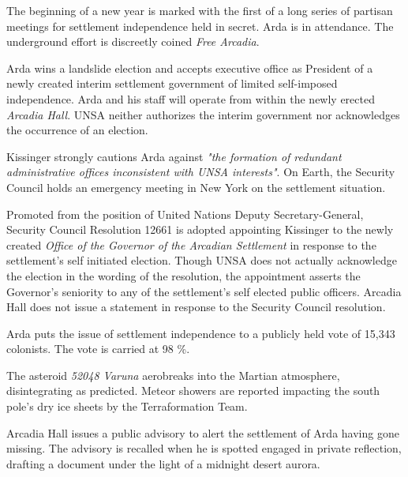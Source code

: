 

The beginning of a new year is marked with the first of a long series of partisan meetings for settlement independence held in secret. Arda is in attendance. The underground effort is discreetly coined {\it Free Arcadia}.
\StopTimelineDate

Arda wins a landslide election and accepts executive office as President of a newly created interim settlement government of limited self-imposed independence. Arda and his staff will operate from within the newly erected {\it Arcadia Hall}. UNSA neither authorizes the interim government nor acknowledges the occurrence of an election.

Kissinger strongly cautions Arda against {\it "the formation of redundant administrative offices inconsistent with UNSA interests"}. On Earth, the Security Council holds an emergency meeting in New York on the settlement situation.
\StopTimelineDate

Promoted from the position of United Nations Deputy Secretary-General, Security Council Resolution 12661 is adopted appointing Kissinger to the newly created {\it Office of the Governor of the Arcadian Settlement} in response to the settlement's self initiated election. Though UNSA does not actually acknowledge the election in the wording of the resolution, the appointment asserts the Governor's seniority to any of the settlement's self elected public officers. Arcadia Hall does not issue a statement in response to the Security Council resolution.
\StopTimelineDate

Arda puts the issue of settlement independence to a publicly held vote of 15,343 colonists. The vote is carried at 98 \%.
\StopTimelineDate

The asteroid {\it 52048 Varuna} aerobreaks into the Martian atmosphere, disintegrating as predicted. Meteor showers are reported impacting the south pole's dry ice sheets by the Terraformation Team.
\StopTimelineDate

Arcadia Hall issues a public advisory to alert the settlement of Arda having gone missing. The advisory is recalled when he is spotted engaged in private reflection, drafting a document under the light of a midnight desert aurora.
\StopTimelineDate

